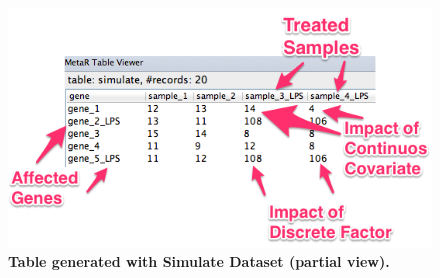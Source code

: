 \begin{figure}[h!tbp]
  \centering
  \includegraphics[width=\figWidthWide]{figures/SimulateTableViewer.png}
\caption[Table generated with Simulate Dataset.]{\textbf{Table generated with Simulate Dataset (partial view).}}
\label{fig:SimulateDatasetViewer}
\end{figure}

